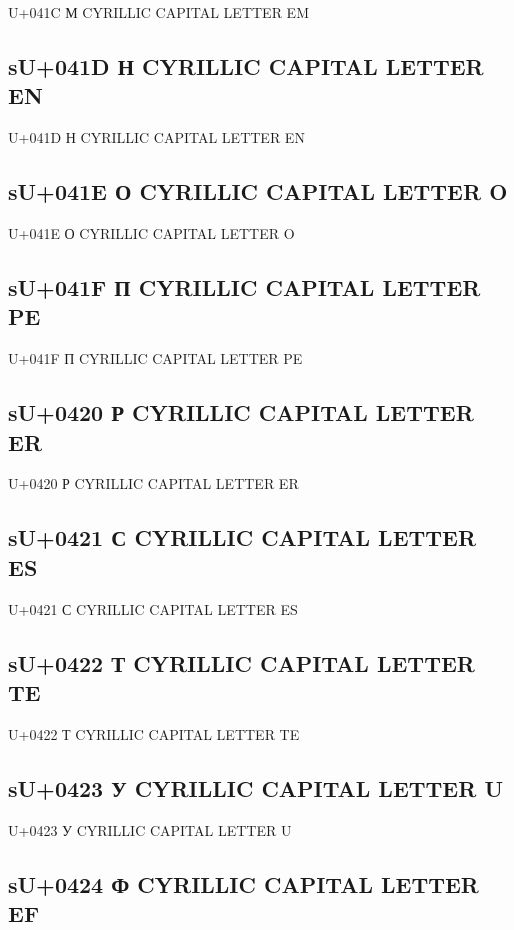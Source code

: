 U+041C М  CYRILLIC CAPITAL LETTER EM

\subsection{sU+041D Н  CYRILLIC CAPITAL LETTER EN}

U+041D Н  CYRILLIC CAPITAL LETTER EN

\subsection{sU+041E О  CYRILLIC CAPITAL LETTER O}

U+041E О  CYRILLIC CAPITAL LETTER O

\subsection{sU+041F П  CYRILLIC CAPITAL LETTER PE}

U+041F П  CYRILLIC CAPITAL LETTER PE

\subsection{sU+0420 Р  CYRILLIC CAPITAL LETTER ER}

U+0420 Р  CYRILLIC CAPITAL LETTER ER

\subsection{sU+0421 С  CYRILLIC CAPITAL LETTER ES}

U+0421 С  CYRILLIC CAPITAL LETTER ES

\subsection{sU+0422 Т  CYRILLIC CAPITAL LETTER TE}

U+0422 Т  CYRILLIC CAPITAL LETTER TE

\subsection{sU+0423 У  CYRILLIC CAPITAL LETTER U}

U+0423 У  CYRILLIC CAPITAL LETTER U

\subsection{sU+0424 Ф  CYRILLIC CAPITAL LETTER EF}

